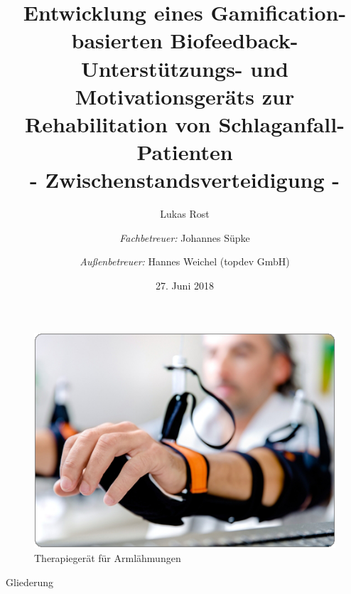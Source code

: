 \documentclass[hyphens]{beamer}
\begin{document}
  \title[Gerät zur Schlaganfall-Rehabilitation]{Entwicklung eines Gamification-basierten Biofeedback-Unterstützungs- und Motivationsgeräts zur Rehabilitation von Schlaganfall-Patienten \\ \small{- Zwischenstandsverteidigung -}}
  \author[Lukas Rost]{Lukas Rost  \\ \and \emph{Fachbetreuer:} Johannes Süpke \\ \and \emph{Außenbetreuer:} Hannes Weichel (topdev GmbH)}
  \date{27. Juni 2018}

 \begin{frame}
 \titlepage
 \end{frame}

  \begin{frame}
\begin{figure}
\includegraphics[scale=0.6]{../Themenverteidigung/pics/einleit1}
  \caption{Therapiegerät für Armlähmungen}
\end{figure}
 \end{frame}

 \begin{frame}
 \titlepage
 \end{frame}

 \begin{frame}{Gliederung}
 \tableofcontents
 \end{frame}
\end{document}
